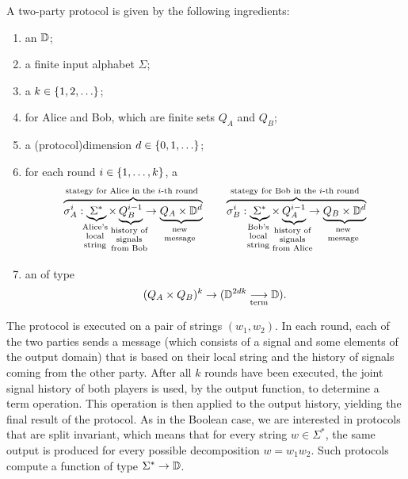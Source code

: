 \begin{definition}\label{def:two-party-protocol-general} A two-party protocol   
   is given by the following ingredients: 
  \begin{enumerate}
    \item an  $\mathbb D$;
    \item a finite input alphabet $\Sigma$;
    \item a  $k \in \{1,2,\ldots\}$;
    \item {} for Alice and Bob, which are finite sets $Q_A$ and $Q_B$;
    \item a \intro(protocol){dimension} $d \in \{0,1,\ldots\}$;
    \item for each round $i \in \{1,\ldots,k\}$, a 
    \begin{align*}
    \myoverbrace{\sigma_A^i : \myunderbrace{\Sigma^*}{Alice's \\ local\\ string} \times \myunderbrace{Q_B^{i-1}}{history of \\ signals \\ from Bob}  \to \myunderbrace{Q_A \times \domain^d}{new\\ message}}{stategy for Alice in the $i$-th round}
    \qquad 
        \myoverbrace{\sigma_B^i : \myunderbrace{\Sigma^*}{Bob's \\ local\\ string} \times \myunderbrace{Q_A^{i-1}}{history of \\ signals \\ from Alice}  \to \myunderbrace{Q_B \times \domain^d}{new\\ message}}{stategy for Bob in the $i$-th round}
    \end{align*}
    \item an  of type \begin{align*}
    (Q_A \times Q_B)^{k} \to (\mathbb D^{2dk} \underset{\text{term}}{\longrightarrow} \mathbb D).
    \end{align*}
  \end{enumerate}
\end{definition}




The protocol is executed on a pair of strings $(w_1,w_2)$. In each round, each of the two parties  sends a message (which consists of a signal and some elements of the output domain) that is based on their local string and the history of signals coming from the other party. After all $k$ rounds have been executed, the joint signal history of both players is used, by the output function, to determine a term operation. This operation is then applied to the output history, yielding the final result of the protocol. As in the Boolean case, we are interested in protocols that are split invariant, which means that for every string $w \in \Sigma^*$, the same output is produced for every possible decomposition $w = w_1 w_2$. Such protocols compute a function of type $\Sigma^* \to \mathbb D$. 

